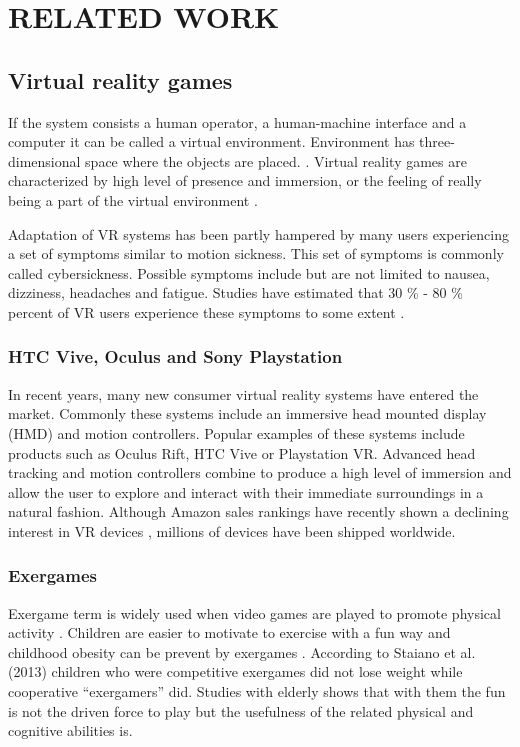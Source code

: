 \documentclass{sig-alternate-05-2015}
\begin{document}
\section{RELATED WORK}
\subsection{Virtual reality games}
If the system consists a human operator, a human-machine interface and 
a computer it can be called a virtual environment. Environment has 
three-dimensional space where the objects are placed. 
\cite{national1995virtual}. Virtual reality games are characterized by high 
level of presence and immersion, or the feeling of really being a part 
of the virtual environment \cite{steuer1992defining}.

Adaptation of VR systems has been partly hampered by many users 
experiencing a set of symptoms similar to motion sickness. This set 
of symptoms is commonly called cybersickness. Possible symptoms include 
but are not limited to nausea, dizziness, headaches and fatigue. 
Studies have estimated that 30 \% - 80 \% percent of VR users 
experience these symptoms to some extent \cite{rebenitsch2016review}.

\subsubsection{HTC Vive, Oculus and Sony Playstation}
In recent years, many new consumer virtual reality systems have entered 
the market. Commonly these systems include an immersive head mounted 
display (HMD) and motion controllers. Popular examples of these systems 
include products such as Oculus Rift, HTC Vive or Playstation VR. Advanced 
head tracking and motion controllers combine to produce a high level of 
immersion and allow the user to explore and interact with their immediate 
surroundings in a natural fashion. Although Amazon sales rankings have 
recently shown a declining interest in VR devices \cite{vr_consumer}, 
millions of devices have been shipped worldwide.

\subsubsection{Exergames}
Exergame term is widely used when video games are played to promote 
physical activity \cite{oh2010defining}. Children are easier to motivate 
to exercise with a fun way and childhood obesity can be prevent by 
exergames \cite{staiano2013adolescent}. According to Staiano et al. (2013) 
children who were competitive exergames did not lose weight while 
cooperative “exergamers” did. Studies with elderly shows that with 
them the fun is not the driven force to play but the usefulness of 
the related physical and cognitive abilities is. \cite{chen2018acceptance}
\end{document}
